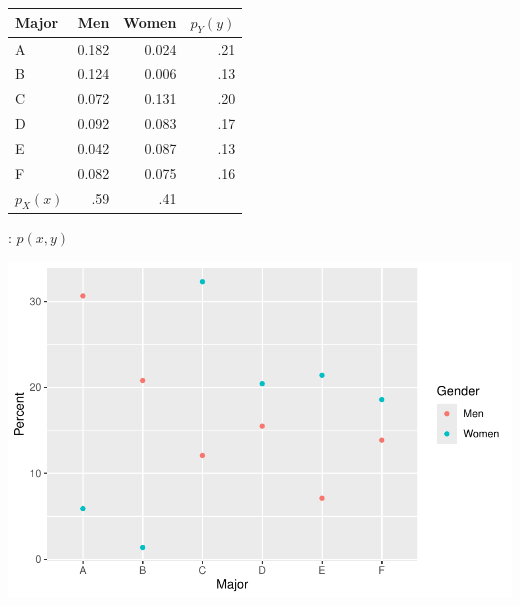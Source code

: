 \begin{frame}
  \begin{block}{\examplectd}
    \begin{center}
      \begin{tabular}{lrr|r}
        \hline
        Major & Men & Women & $p_Y(y)$\\ 
        \hline
        A & 0.182 & 0.024 & .21\\ 
        B & 0.124 & 0.006 & .13\\ 
        C & 0.072 & 0.131 & .20\\ 
        D & 0.092 & 0.083 & .17\\ 
        E & 0.042 & 0.087 & .13\\ 
        F & 0.082 & 0.075 & .16\\ 
        \hline
        $p_X(x)$ & .59 & .41
      \end{tabular}
    \end{center}
  \end{block}
\end{frame}

\begin{frame}
  \begin{block}{\examplectd: $p(x,y)$}
    \begin{center}
      \includegraphics[height=.7\textheight]{figure/berkeley-1}
    \end{center}
  \end{block}
\end{frame}



